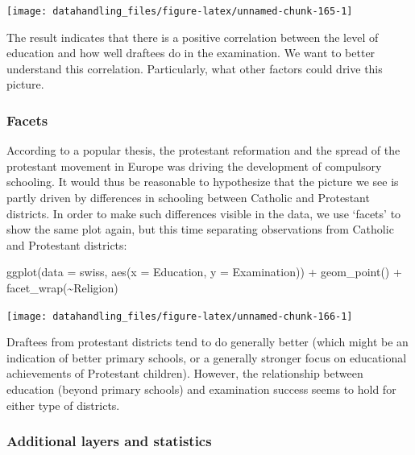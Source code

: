\documentclass[
  12pt,
]{style/krantz}
\newenvironment{Shaded}{\begin{snugshade}}{\end{snugshade}}
\newcommand{\AttributeTok}[1]{\textcolor[rgb]{0.77,0.63,0.00}{#1}}
\newcommand{\FunctionTok}[1]{\textcolor[rgb]{0.00,0.00,0.00}{#1}}
\newcommand{\NormalTok}[1]{#1}
\newcommand{\SpecialCharTok}[1]{\textcolor[rgb]{0.00,0.00,0.00}{#1}}
\begin{document}
\texttt{[image: datahandling\_files/figure-latex/unnamed-chunk-165-1]}

The result indicates that there is a positive correlation between the level of education and how well draftees do in the examination. We want to better understand this correlation. Particularly, what other factors could drive this picture.

\hypertarget{facets}{%
\subsubsection{Facets}\label{facets}}

According to a popular thesis, the protestant reformation and the spread of the protestant movement in Europe was driving the development of compulsory schooling. It would thus be reasonable to hypothesize that the picture we see is partly driven by differences in schooling between Catholic and Protestant districts. In order to make such differences visible in the data, we use `facets' to show the same plot again, but this time separating observations from Catholic and Protestant districts:

\begin{Shaded}
\begin{Highlighting}[]
\FunctionTok{ggplot}\NormalTok{(}\AttributeTok{data =}\NormalTok{ swiss, }\FunctionTok{aes}\NormalTok{(}\AttributeTok{x =}\NormalTok{ Education, }\AttributeTok{y =}\NormalTok{ Examination)) }\SpecialCharTok{+} 
     \FunctionTok{geom\_point}\NormalTok{() }\SpecialCharTok{+}
     \FunctionTok{facet\_wrap}\NormalTok{(}\SpecialCharTok{\textasciitilde{}}\NormalTok{Religion)}
\end{Highlighting}
\end{Shaded}

\texttt{[image: datahandling\_files/figure-latex/unnamed-chunk-166-1]}

Draftees from protestant districts tend to do generally better (which might be an indication of better primary schools, or a generally stronger focus on educational achievements of Protestant children). However, the relationship between education (beyond primary schools) and examination success seems to hold for either type of districts.

\hypertarget{additional-layers-and-statistics}{%
\subsubsection{Additional layers and statistics}\label{additional-layers-and-statistics}}
\end{document}
